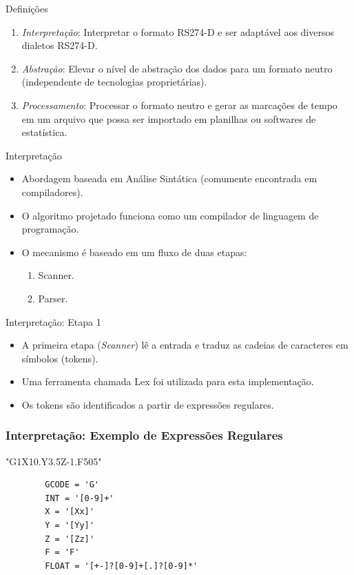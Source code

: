 \documentclass[aspectratio=169]{beamer}
\begin{document}
{\begin{frame}{Definições}
  \begin{enumerate}
    \item {
      \emph{Interpretação}: Interpretar o formato RS274-D e ser adaptável aos diversos 
      dialetos RS274-D.
    }
    \item {
      \emph{Abstração}: Elevar o nível de abstração dos dados para um formato neutro
      (independente de tecnologias proprietárias).
    }
    \item {
      \emph{Processamento}: Processar o formato neutro e gerar 
      as marcações de tempo em um arquivo que possa ser importado em planilhas ou 
      softwares de estatística.
    }
  \end{enumerate}
\end{frame}


\begin{frame}{Interpretação}
  \begin{itemize}
    \item {
      Abordagem baseada em An\'alise Sint\'atica (comumente encontrada em compiladores).
    }
    \item {
      O algoritmo projetado funciona como um compilador de linguagem de programa\c c\~ao.
    }
    \item {
      O mecanismo \'e baseado em um fluxo de duas etapas:
      \begin{enumerate}
        \item Scanner.
        \item Parser.
      \end{enumerate}
    }
  \end{itemize}
\end{frame}


\begin{frame}{Interpretação: Etapa 1}
  \begin{itemize}
    \item A primeira etapa (\emph{Scanner}) l\^e a entrada e traduz as cadeias de caracteres em símbolos (tokens). 
    \item Uma ferramenta chamada Lex foi utilizada para esta implementa\c c\~ao.
    \item Os tokens são identificados a partir de expressões regulares.
  \end{itemize}
\end{frame}


\begin{frame}[fragile]
  \frametitle{Interpretação: Exemplo de Expressões Regulares}
  \begin{example}
      "G1X10.Y3.5Z-1.F505"
      \begin{lstlisting}
        GCODE = 'G'        
        INT = '[0-9]+'
        X = '[Xx]'
        Y = '[Yy]'
        Z = '[Zz]'
        F = 'F'
        FLOAT = '[+-]?[0-9]+[.]?[0-9]*'
      \end{lstlisting}
    \end{example}
  \end{frame}


}
\end{document}
